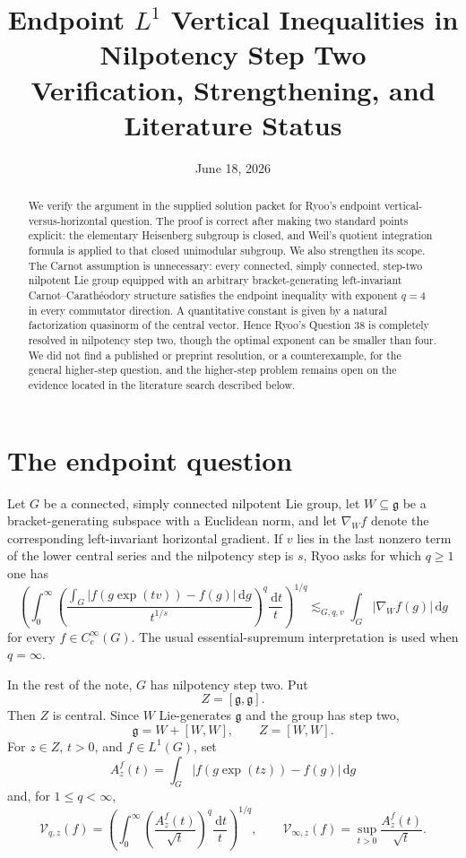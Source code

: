 \documentclass[11pt]{article}
\title{Endpoint \(L^1\) Vertical Inequalities in Nilpotency Step Two\\
Verification, Strengthening, and Literature Status}
\author{}
\date{June 18, 2026}
\theoremstyle{remark}
\newcommand{\g}{\mathfrak g}
\newcommand{\dd}{\,\mathrm d}
\newcommand{\abs}[1]{\lvert #1\rvert}
\begin{document}
\maketitle

\begin{abstract}
We verify the argument in the supplied solution packet for Ryoo's endpoint
vertical-versus-horizontal question.  The proof is correct after making two standard
points explicit: the elementary Heisenberg subgroup is closed, and Weil's quotient
integration formula is applied to that closed unimodular subgroup.  We also strengthen
its scope.  The Carnot assumption is unnecessary: every connected, simply connected,
step-two nilpotent Lie group equipped with an arbitrary bracket-generating left-invariant
Carnot--Carath\'eodory structure satisfies the endpoint inequality with exponent \(q=4\)
in every commutator direction.  A quantitative constant is given by a natural factorization
quasinorm of the central vector.  Hence Ryoo's Question 38 is completely resolved in
nilpotency step two, though the optimal exponent can be smaller than four.  We did not
find a published or preprint resolution, or a counterexample, for the general higher-step
question, and the higher-step problem remains open on the evidence located in the
literature search described below.
\end{abstract}

\section{The endpoint question}
Let \(G\) be a connected, simply connected nilpotent Lie group, let \(W\subseteq\g\)
be a bracket-generating subspace with a Euclidean norm, and let \(\nabla_W f\) denote
the corresponding left-invariant horizontal gradient.  If \(v\) lies in the last nonzero
term of the lower central series and the nilpotency step is \(s\), Ryoo asks for which
\(q\geq 1\) one has
\begin{equation}\label{eq:Ryoo}
 \left(\int_0^\infty
 \left(\frac{\displaystyle\int_G
 \abs{f(g\exp(tv))-f(g)}\dd g}{t^{1/s}}\right)^q
 \frac{\dd t}{t}\right)^{1/q}
 \lesssim_{G,q,v}\int_G\abs{\nabla_W f(g)}\dd g
\end{equation}
for every \(f\in C_c^\infty(G)\).  The usual essential-supremum interpretation is used
when \(q=\infty\).

In the rest of the note, \(G\) has nilpotency step two.  Put
\[
 Z=[\g,\g].
\]
Then \(Z\) is central.  Since \(W\) Lie-generates \(\g\) and the group has step two,
\begin{equation}\label{eq:bracket-spans}
 \g=W+[W,W],\qquad Z=[W,W].
\end{equation}
For \(z\in Z\), \(t>0\), and \(f\in L^1(G)\), set
\[
 A_z^f(t)=\int_G\abs{f(g\exp(tz))-f(g)}\dd g
\]
and, for \(1\le q<\infty\),
\[
 \mathcal V_{q,z}(f)=
 \left(\int_0^\infty\left(\frac{A_z^f(t)}{\sqrt t}\right)^q
 \frac{\dd t}{t}\right)^{1/q},
 \qquad
 \mathcal V_{\infty,z}(f)=\sup_{t>0}\frac{A_z^f(t)}{\sqrt t}.
\]
\end{document}
